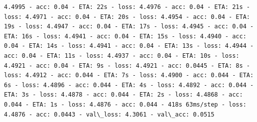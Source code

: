 \documentclass[11pt]{article}
\begin{document}
\begin{Verbatim}[commandchars=\\\{\}]
4.4995 - acc: 0.04 - ETA: 22s - loss: 4.4976 - acc: 0.04 - ETA: 21s - loss: 4.4971 - acc: 0.04 - ETA: 20s - loss: 4.4954 - acc: 0.04 - ETA: 19s - loss: 4.4947 - acc: 0.04 - ETA: 17s - loss: 4.4945 - acc: 0.04 - ETA: 16s - loss: 4.4941 - acc: 0.04 - ETA: 15s - loss: 4.4940 - acc: 0.04 - ETA: 14s - loss: 4.4941 - acc: 0.04 - ETA: 13s - loss: 4.4944 - acc: 0.04 - ETA: 11s - loss: 4.4937 - acc: 0.04 - ETA: 10s - loss: 4.4921 - acc: 0.04 - ETA: 9s - loss: 4.4921 - acc: 0.0445 - ETA: 8s - loss: 4.4912 - acc: 0.044 - ETA: 7s - loss: 4.4900 - acc: 0.044 - ETA: 6s - loss: 4.4896 - acc: 0.044 - ETA: 4s - loss: 4.4892 - acc: 0.044 - ETA: 3s - loss: 4.4878 - acc: 0.044 - ETA: 2s - loss: 4.4868 - acc: 0.044 - ETA: 1s - loss: 4.4876 - acc: 0.044 - 418s 63ms/step - loss: 4.4876 - acc: 0.0443 - val\_loss: 4.3061 - val\_acc: 0.0515


\end{Verbatim}
\end{document}
